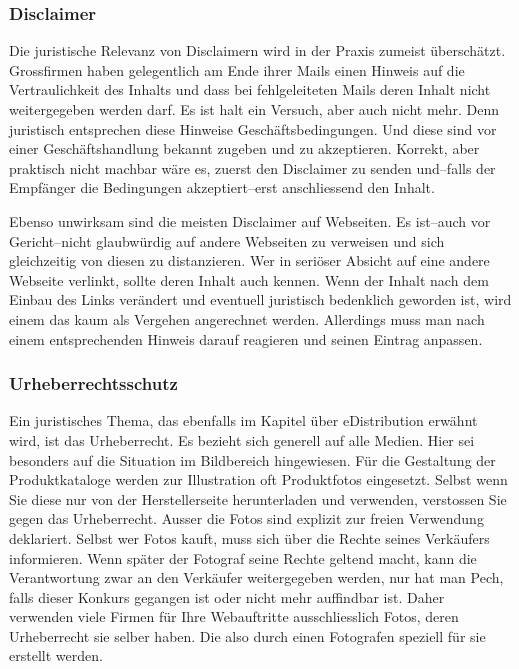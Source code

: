 \subsubsection*{Disclaimer}

Die juristische Relevanz von Disclaimern wird in der Praxis zumeist überschätzt.
Grossfirmen haben gelegentlich am Ende ihrer Mails einen Hinweis auf die
Vertraulichkeit des Inhalts und dass bei fehlgeleiteten Mails deren Inhalt
nicht weitergegeben werden darf. Es ist halt ein Versuch, aber auch nicht
mehr. Denn juristisch entsprechen diese Hinweise Geschäftsbedingungen.
Und diese sind vor einer Geschäftshandlung bekannt zugeben und zu akzeptieren.
Korrekt, aber praktisch nicht machbar wäre es, zuerst den Disclaimer zu
senden und--falls der Empfänger die Bedingungen akzeptiert--erst anschliessend
den Inhalt.

Ebenso unwirksam sind die meisten Disclaimer auf Webseiten. Es ist--auch vor
Gericht--nicht glaubwürdig auf andere Webseiten zu verweisen und sich gleichzeitig
von diesen zu distanzieren. Wer in seriöser Absicht auf eine andere Webseite
verlinkt, sollte deren Inhalt auch kennen. Wenn der Inhalt nach dem Einbau des
Links verändert und eventuell juristisch bedenklich geworden ist, wird einem
das kaum als Vergehen angerechnet werden. Allerdings muss man nach einem
entsprechenden Hinweis darauf reagieren und seinen Eintrag anpassen.

\subsubsection*{Urheberrechtsschutz}

Ein juristisches Thema, das ebenfalls im Kapitel über eDistribution erwähnt
wird, ist das Urheberrecht. Es bezieht sich generell auf alle Medien. Hier
sei besonders auf die Situation im Bildbereich hingewiesen. Für die
Gestaltung der Produktkataloge werden zur Illustration oft Produktfotos
eingesetzt. Selbst wenn Sie diese nur von der Herstellerseite herunterladen
und verwenden, verstossen Sie gegen das Urheberrecht. Ausser die Fotos
sind explizit zur freien Verwendung deklariert. Selbst wer Fotos kauft,
muss sich über die Rechte seines Verkäufers informieren. Wenn später der
Fotograf seine Rechte geltend macht, kann die Verantwortung zwar an den
Verkäufer weitergegeben werden, nur hat man Pech, falls dieser Konkurs
gegangen ist oder nicht mehr auffindbar ist. Daher verwenden viele Firmen
für Ihre Webauftritte ausschliesslich Fotos, deren Urheberrecht sie selber
haben. Die also durch einen Fotografen speziell für sie erstellt werden.


